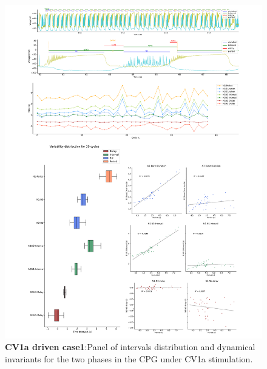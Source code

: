 \begin{figure}[htbp]
	\centering
	\includegraphics[width=1.1\textwidth]{./invariants/data/SUSSEX/CV1a_driven1/images/2phases/panel_with_intervals.pdf}
	\caption{\textbf{CV1a driven case1}:Panel of intervals distribution and dynamical invariants for the two phases in the CPG under CV1a stimulation.}
	\label{fig:cv1a 1 2phases}
\end{figure}


